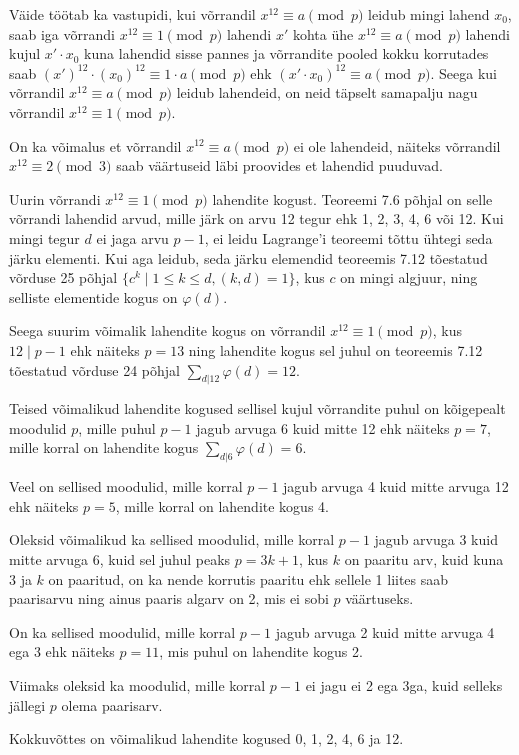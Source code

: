 \documentclass[a4paper, 10pt]{article}
\begin{document}
Väide töötab ka vastupidi, kui võrrandil $x^{12}\equiv a\pmod p$ leidub mingi lahend $x_0$, saab iga võrrandi $x^{12}\equiv1\pmod p$ lahendi $x'$ kohta ühe $x^{12}\equiv a\pmod p$ lahendi kujul $x'\cdot x_0$ kuna lahendid sisse pannes ja võrrandite pooled kokku korrutades saab $(x')^{12}\cdot (x_0)^{12}\equiv 1\cdot a\pmod p$ ehk $(x'\cdot x_0)^{12}\equiv a\pmod p$. Seega kui võrrandil $x^{12}\equiv a\pmod p$ leidub lahendeid, on neid täpselt samapalju nagu võrrandil $x^{12}\equiv 1\pmod p$.

On ka võimalus et võrrandil $x^{12}\equiv a\pmod p$ ei ole lahendeid, näiteks võrrandil $x^{12}\equiv2\pmod 3$ saab väärtuseid läbi proovides et lahendid puuduvad.

Uurin võrrandi $x^{12}\equiv1\pmod p$ lahendite kogust. Teoreemi 7.6 põhjal on selle võrrandi lahendid arvud, mille järk on arvu 12 tegur ehk 1, 2, 3, 4, 6 või 12. Kui mingi tegur $d$ ei jaga arvu $p-1$, ei leidu Lagrange'i teoreemi tõttu ühtegi seda järku elementi. Kui aga leidub, seda järku elemendid teoreemis 7.12 tõestatud võrduse 25 põhjal $\{c^k\mid 1\leq k\leq d, (k,d)=1\}$, kus $c$ on mingi algjuur, ning selliste elementide kogus on $\varphi(d)$.

Seega suurim võimalik lahendite kogus on võrrandil $x^{12}\equiv1\pmod p$, kus $12\mid p-1$ ehk näiteks $p=13$ ning lahendite kogus sel juhul on teoreemis 7.12 tõestatud võrduse 24 põhjal $\sum_{d|12}\varphi(d)=12$.

Teised võimalikud lahendite kogused sellisel kujul võrrandite puhul on kõigepealt moodulid $p$, mille puhul $p-1$ jagub arvuga 6 kuid mitte 12 ehk näiteks $p=7$, mille korral on lahendite kogus $\sum_{d|6}\varphi(d)=6$.

Veel on sellised moodulid, mille korral $p-1$ jagub arvuga 4 kuid mitte arvuga 12 ehk näiteks $p=5$, mille korral on lahendite kogus 4.

Oleksid võimalikud ka sellised moodulid, mille korral $p-1$ jagub arvuga 3 kuid mitte arvuga 6, kuid sel juhul peaks $p=3k+1$, kus $k$ on paaritu arv, kuid kuna 3 ja $k$ on paaritud, on ka nende korrutis paaritu ehk sellele 1 liites saab paarisarvu ning ainus paaris algarv on 2, mis ei sobi $p$ väärtuseks.

On ka sellised moodulid, mille korral $p-1$ jagub arvuga 2 kuid mitte arvuga 4 ega 3 ehk näiteks $p=11$, mis puhul on lahendite kogus 2.

Viimaks oleksid ka moodulid, mille korral $p-1$ ei jagu ei 2 ega 3ga, kuid selleks jällegi $p$ olema paarisarv.

Kokkuvõttes on võimalikud lahendite kogused 0, 1, 2, 4, 6 ja 12.
\bigskip
\end{document}
